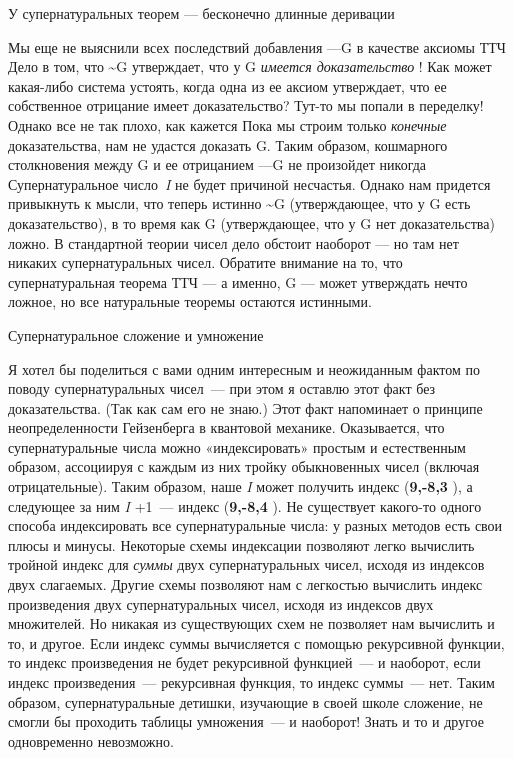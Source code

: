 \documentclass[../main.tex]{subfiles}
\begin{document}
У супернатуральных теорем --- бесконечно длинные деривации

Мы еще не выяснили всех последствий добавления ---G в качестве аксиомы ТТЧ Дело в том, что \textasciitilde G утверждает, что у G \emph{имеется доказательство} ! Как может какая-либо система устоять, когда одна из ее аксиом утверждает, что ее собственное отрицание имеет доказательство? Тут-то мы попали в переделку! Однако все не так плохо, как кажется Пока мы строим только \emph{конечные} доказательства, нам не удастся доказать G. Таким образом, кошмарного столкновения между G и ее отрицанием ---G не произойдет никогда Супернатуральное число~\emph{I} не будет причиной несчастья. Однако нам придется привыкнуть к мысли, что теперь истинно \textasciitilde G (утверждающее, что у G есть доказательство), в то время как G (утверждающее, что у G нет доказательства) ложно. В стандартной теории чисел дело обстоит наоборот --- но там нет никаких супернатуральных чисел. Обратите внимание на то, что супернатуральная теорема ТТЧ --- а именно, G --- может утверждать нечто ложное, но все натуральные теоремы остаются истинными.

Супернатуральное сложение и умножение

Я хотел бы поделиться с вами одним интересным и неожиданным фактом по поводу супернатуральных чисел~--- при этом я оставлю этот факт без доказательства. (Так как сам его не знаю.) Этот факт напоминает о принципе неопределенности Гейзенберга в квантовой механике. Оказывается, что супернатуральные числа можно «индексировать» простым и естественным образом, ассоциируя с каждым из них тройку обыкновенных чисел (включая отрицательные). Таким образом, наше \emph{I} может получить индекс (\textbf{9,-8,3} ), а следующее за ним \emph{I} +1~--- индекс (\textbf{9,-8,4} ). Не существует какого-то одного способа индексировать все супернатуральные числа: у разных методов есть свои плюсы и минусы. Некоторые схемы индексации позволяют легко вычислить тройной индекс для \emph{суммы} двух супернатуральных чисел, исходя из индексов двух слагаемых. Другие схемы позволяют нам с легкостью вычислить индекс произведения двух супернатуральных чисел, исходя из индексов двух множителей. Но никакая из существующих схем не позволяет нам вычислить и то, и другое. Если индекс суммы вычисляется с помощью рекурсивной функции, то индекс произведения не будет рекурсивной функцией~--- и наоборот, если индекс произведения~--- рекурсивная функция, то индекс суммы~--- нет. Таким образом, супернатуральные детишки, изучающие в своей школе сложение, не смогли бы проходить таблицы умножения~--- и наоборот! Знать и то и другое одновременно невозможно.
\end{document}
